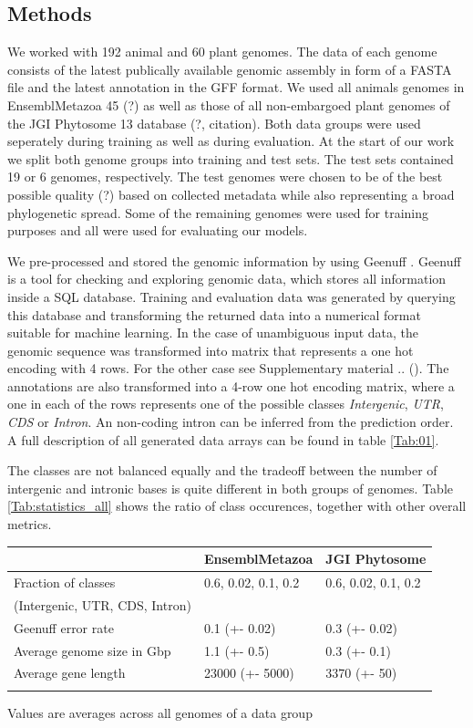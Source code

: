 \documentclass{bioinfo}
\begin{document}
\begin{methods}
\section{Methods}
We worked with 192 animal and 60 plant genomes. The data of each genome consists of the latest publically available genomic assembly in form of a FASTA file and the latest annotation in the GFF format. We used all animals genomes in EnsemblMetazoa 45 (?) \citealp{Howe19} as well as those of all non-embargoed plant genomes of the JGI Phytosome 13 database (?, citation). Both data groups were used seperately during training as well as during evaluation. At the start of our work we split both genome groups into training and test sets. The test sets contained 19 or 6 genomes, respectively. The test genomes were chosen to be of the best possible quality (?) based on collected metadata while also representing a broad phylogenetic spread. Some of the remaining genomes were used for training purposes and all were used for evaluating our models. 

We pre-processed and stored the genomic information by using Geenuff \citealp{Denton19}. Geenuff is a tool for checking and exploring genomic data, which stores all information inside a SQL database. Training and evaluation data was generated by querying this database and transforming the returned data into a numerical format suitable for machine learning. In the case of unambiguous input data, the genomic sequence was transformed into matrix that represents a one hot encoding with 4 rows. For the other case see Supplementary material .. (). The annotations are also transformed into a 4-row one hot encoding matrix, where a one in each of the rows represents one of the possible classes {\it Intergenic}, {\it UTR}, {\it CDS} or {\it Intron}. An non-coding intron can be inferred from the prediction order. A full description of all generated data arrays can be found in table \ref{Tab:01}.

The classes are not balanced equally and the tradeoff between the number of intergenic and intronic bases is quite different in both groups of genomes. Table \ref{Tab:statistics_all} shows the ratio of class occurences, together with other overall metrics.

\begin{table}[!t]
 {
\begin{tabular}{@{}lll@{}}
\toprule & EnsemblMetazoa & JGI Phytosome\\
\midrule
Fraction of classes  & 0.6, 0.02, 0.1, 0.2 & 0.6, 0.02, 0.1, 0.2 \\
(Intergenic, UTR, CDS, Intron) & & \\
Geenuff error rate & 0.1 (+- 0.02) & 0.3 (+- 0.02) \\
Average genome size in Gbp& 1.1 (+- 0.5) & 0.3 (+- 0.1) \\
Average gene length & 23000 (+- 5000) & 3370 (+- 50) \\
\botrule
\end{tabular}}{Values are averages across all genomes of a data group}
\end{table}


\end{methods}
\end{document}
